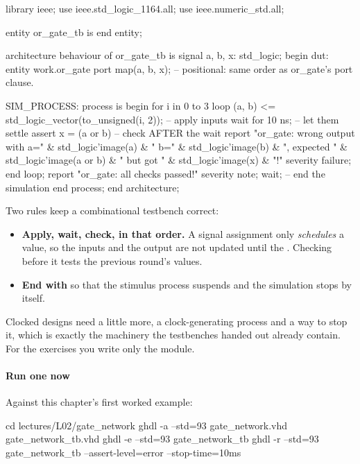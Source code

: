 \begin{vhdlcode}
library ieee;
use ieee.std_logic_1164.all;
use ieee.numeric_std.all;

entity or_gate_tb is
end entity;

architecture behaviour of or_gate_tb is
signal a, b, x: std_logic;
begin
    dut: entity work.or_gate
        port map(a, b, x);   -- positional: same order as or_gate's port clause.

    SIM_PROCESS: process is
    begin
        for i in 0 to 3 loop
            (a, b) <= std_logic_vector(to_unsigned(i, 2));   -- apply inputs
            wait for 10 ns;                                  -- let them settle
            assert x = (a or b)                              -- check AFTER the wait
                report "or_gate: wrong output with a=" & std_logic'image(a)
                     & " b=" & std_logic'image(b)
                     & ", expected " & std_logic'image(a or b)
                     & " but got " & std_logic'image(x) & "!"
                severity failure;
        end loop;
        report "or_gate: all checks passed!" severity note;
        wait;                                                -- end the simulation
    end process;
end architecture;
\end{vhdlcode}

Two rules keep a combinational testbench correct:
\begin{itemize}
  \item \textbf{Apply, wait, check, in that order.} A signal assignment only \emph{schedules} a
    value, so the inputs and the output are not updated until the . Checking before it
    tests the previous round's values.
  \item \textbf{End with } so that the stimulus process suspends and the simulation
    stops by itself.
\end{itemize}

Clocked designs need a little more, a clock-generating process and a way to stop it, which is
exactly the machinery the testbenches handed out already contain. For the exercises you write only
the module.

\paragraph{Run one now}
Against this chapter's first worked example:

\begin{shell}
cd lectures/L02/gate_network
ghdl -a --std=93 gate_network.vhd gate_network_tb.vhd
ghdl -e --std=93 gate_network_tb
ghdl -r --std=93 gate_network_tb --assert-level=error --stop-time=10ms
\end{shell}
